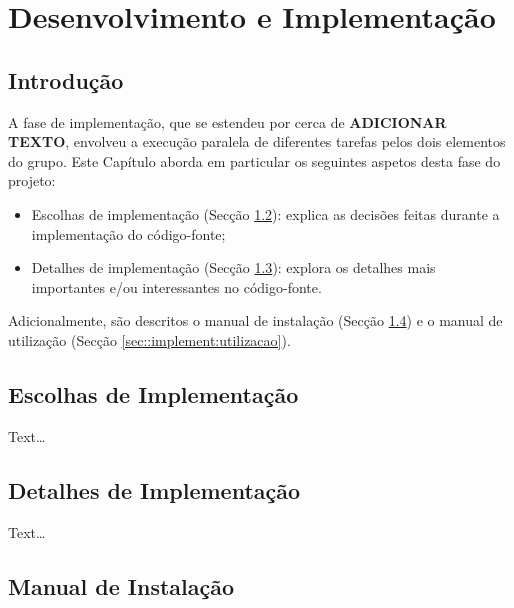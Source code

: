 \chapter{Desenvolvimento e Implementação}
\label{ch::implement}

\section{Introdução}
\label{sec::implement:intro}

A fase de implementação, que se estendeu por cerca de \textbf{ADICIONAR TEXTO}, envolveu a execução paralela de diferentes tarefas pelos dois elementos do grupo. Este Capítulo aborda em particular os seguintes aspetos desta fase do projeto:

\begin{itemize}%
	\item Escolhas de implementação (Secção \ref{sec::implement:escolhas}): explica as decisões feitas durante a implementação do código-fonte;
	\item Detalhes de implementação (Secção \ref{sec::implement:detalhes}): explora os detalhes mais importantes e/ou interessantes no código-fonte.
\end{itemize}

Adicionalmente, são descritos o manual de instalação (Secção \ref{sec::implement:instalar}) e %
o manual de utilização (Secção \ref{sec::implement:utilizacao}). %


\section{Escolhas de Implementação}
\label{sec::implement:escolhas}

Text\ldots


\section{Detalhes de Implementação}
\label{sec::implement:detalhes}

Text\ldots



\section{Manual de Instalação}
\label{sec::implement:instalar}

